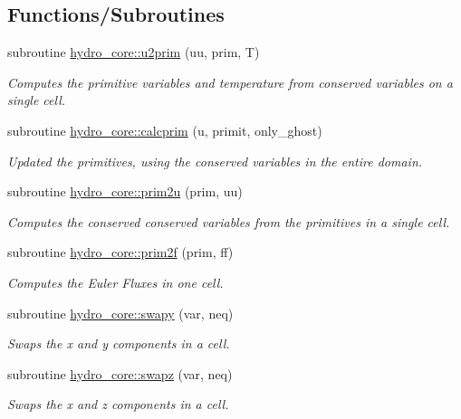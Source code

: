 \subsection*{Functions/\+Subroutines}
\begin{DoxyCompactItemize}
\item 
subroutine \hyperlink{namespacehydro__core_a360e3d64343b30d94d270cfebc5b4eb3}{hydro\+\_\+core\+::u2prim} (uu, prim, T)
\begin{DoxyCompactList}\small\item\em Computes the primitive variables and temperature from conserved variables on a single cell. \end{DoxyCompactList}\item 
subroutine \hyperlink{namespacehydro__core_a7966ebe81c520c9d275c4fd72fcb0870}{hydro\+\_\+core\+::calcprim} (u, primit, only\+\_\+ghost)
\begin{DoxyCompactList}\small\item\em Updated the primitives, using the conserved variables in the entire domain. \end{DoxyCompactList}\item 
subroutine \hyperlink{namespacehydro__core_a98cafc8f97d7a1b3f8050b8e442194c3}{hydro\+\_\+core\+::prim2u} (prim, uu)
\begin{DoxyCompactList}\small\item\em Computes the conserved conserved variables from the primitives in a single cell. \end{DoxyCompactList}\item 
subroutine \hyperlink{namespacehydro__core_a725c2c598f080ea420f4043dbda3f996}{hydro\+\_\+core\+::prim2f} (prim, ff)
\begin{DoxyCompactList}\small\item\em Computes the Euler Fluxes in one cell. \end{DoxyCompactList}\item 
subroutine \hyperlink{namespacehydro__core_a64856096f7a7b7f65be1154d31916c2d}{hydro\+\_\+core\+::swapy} (var, neq)
\begin{DoxyCompactList}\small\item\em Swaps the x and y components in a cell. \end{DoxyCompactList}\item 
subroutine \hyperlink{namespacehydro__core_ae4216bc7908e7665f0565aa8c885c821}{hydro\+\_\+core\+::swapz} (var, neq)
\begin{DoxyCompactList}\small\item\em Swaps the x and z components in a cell. \end{DoxyCompactList}\item 

\end{DoxyCompactItemize}
